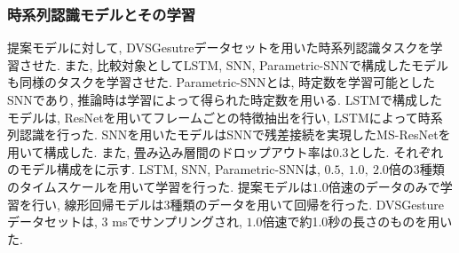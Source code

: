 \subsubsection{時系列認識モデルとその学習}
提案モデルに対して, DVSGesutreデータセットを用いた時系列認識タスクを学習させた.
また, 比較対象としてLSTM, SNN, Parametric-SNN\cite{ParametricSNN}で構成したモデルも同様のタスクを学習させた.
Parametric-SNNとは, 時定数を学習可能としたSNNであり, 推論時は学習によって得られた時定数を用いる.
LSTMで構成したモデルは, ResNet\cite{ResNet}を用いてフレームごとの特徴抽出を行い, LSTMによって時系列認識を行った\cite{CNNLSTM}.
SNNを用いたモデルはSNNで残差接続を実現したMS-ResNet\cite{MSResNet}を用いて構成した.
また, 畳み込み層間のドロップアウト率は0.3とした.
それぞれのモデル構成をに示す.
LSTM, SNN, Parametric-SNNは, $0.5,~1.0,~2.0$倍の3種類のタイムスケールを用いて学習を行った.
提案モデルは$1.0$倍速のデータのみで学習を行い, 線形回帰モデルは3種類のデータを用いて回帰を行った.
DVSGestureデータセットは, 3 msでサンプリングされ, $1.0$倍速で約1.0秒の長さのものを用いた.

